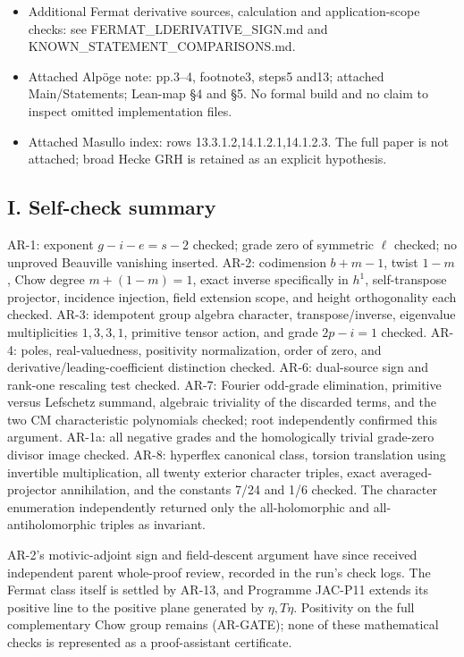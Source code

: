 \begin{itemize}
  Gu 2026: https://arxiv.org/abs/2609.33223 . Local primary v2 read at
  work/references/Gu2026.pdf/.txt: Theorem 1.3, Proposition 5.3, §2.2
  and Corollary 1.6; root's complete AR-10 proof independently checked
  against these statements.
\item
  Additional Fermat derivative sources, calculation and
  application-scope checks: see FERMAT\_LDERIVATIVE\_SIGN.md and
  KNOWN\_STATEMENT\_COMPARISONS.md.
\item
  Attached Alpöge note: pp.3--4, footnote3, steps5 and13; attached
  Main/Statements; Lean-map §4 and §5. No formal build and no claim to
  inspect omitted implementation files.
\item
  Attached Masullo index: rows 13.3.1.2,14.1.2.1,14.1.2.3. The full
  paper is not attached; broad Hecke GRH is retained as an explicit
  hypothesis.
\end{itemize}

\subsection{I. Self-check summary}\label{i.-self-check-summary}

AR-1: exponent \(g-i-e=s-2\) checked; grade zero of symmetric \(\ell\)
checked; no unproved Beauville vanishing inserted. AR-2: codimension
\(b+m-1\), twist \(1-m\), Chow degree \(m+(1-m)=1\), exact inverse
specifically in \(h^1\), self-transpose projector, incidence injection,
field extension scope, and height orthogonality each checked. AR-3:
idempotent group algebra character, transpose/inverse, eigenvalue
multiplicities \(1,3,3,1\), primitive tensor action, and grade
\(2p-i=1\) checked. AR-4: poles, real-valuedness, positivity
normalization, order of zero, and derivative/leading-coefficient
distinction checked. AR-6: dual-source sign and rank-one rescaling test
checked. AR-7: Fourier odd-grade elimination, primitive versus Lefschetz
summand, algebraic triviality of the discarded terms, and the two CM
characteristic polynomials checked; root independently confirmed this
argument. AR-1a: all negative grades and the homologically trivial
grade-zero divisor image checked. AR-8: hyperflex canonical class,
torsion translation using invertible multiplication, all twenty exterior
character triples, exact averaged-projector annihilation, and the
constants 7/24 and 1/6 checked. The character enumeration independently
returned only the all-holomorphic and all-antiholomorphic triples as
invariant.

AR-2's motivic-adjoint sign and field-descent argument have since
received independent parent whole-proof review, recorded in the run's
check logs. The Fermat class itself is settled by AR-13, and Programme
JAC-P11 extends its positive line to the positive plane generated by
\(\eta,T\eta\). Positivity on the full complementary Chow group remains
(AR-GATE); none of these mathematical checks is represented as a
proof-assistant certificate.
